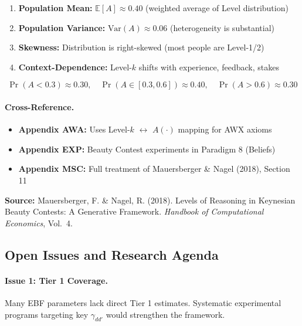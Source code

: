 \begin{enumerate}[nosep]
    \item \textbf{Population Mean:} $\mathbb{E}[A] \approx 0.40$ (weighted average of Level distribution)
    \item \textbf{Population Variance:} $\text{Var}(A) \approx 0.06$ (heterogeneity is substantial)
    \item \textbf{Skewness:} Distribution is right-skewed (most people are Level-1/2)
    \item \textbf{Context-Dependence:} Level-$k$ shifts with experience, feedback, stakes
\end{enumerate}

\begin{equation}
\Pr(A < 0.3) \approx 0.30, \quad \Pr(A \in [0.3, 0.6]) \approx 0.40, \quad \Pr(A > 0.6) \approx 0.30
\tag{BBB-LK}
\end{equation}

\paragraph{Cross-Reference.}
\begin{itemize}[nosep]
    \item \textbf{Appendix AWA:} Uses Level-$k$ $\leftrightarrow$ $A(\cdot)$ mapping for AWX axioms
    \item \textbf{Appendix EXP:} Beauty Contest experiments in Paradigm 8 (Beliefs)
    \item \textbf{Appendix MSC:} Full treatment of Mauersberger \& Nagel (2018), Section 11
\end{itemize}

\textbf{Source:} Mauersberger, F. \& Nagel, R. (2018). Levels of Reasoning in Keynesian
Beauty Contests: A Generative Framework. \textit{Handbook of Computational Economics}, Vol.\ 4.


\subsection{Open Issues and Research Agenda}
\label{sec:BBB-openissues}

\paragraph{Issue 1: Tier 1 Coverage.}
Many EBF parameters lack direct Tier 1 estimates. Systematic experimental
programs targeting key $\gamma_{dd'}$ would strengthen the framework.

